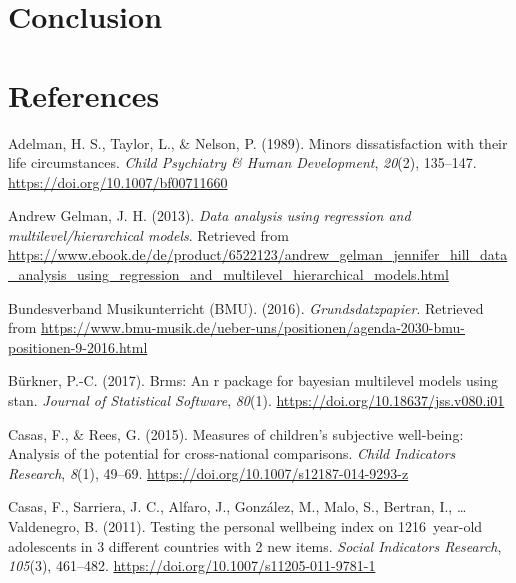 \documentclass[a4, 12pt]{article}
\begin{document}
\clearpage

\hypertarget{conclusion}{%
\section{Conclusion}\label{conclusion}}

\label{sec:conclusion}

\clearpage

\hypertarget{references}{%
\section*{References}\label{references}}

\singlespacing

\setlength{\parindent}{-0.5in}
\setlength{\leftskip}{0.5in}
\setlength{\parskip}{8pt}

\noindent

\hypertarget{refs}{}
\leavevmode\hypertarget{ref-Adelman1989}{}%
Adelman, H. S., Taylor, L., \& Nelson, P. (1989). Minors dissatisfaction with their life circumstances. \emph{Child Psychiatry \& Human Development}, \emph{20}(2), 135--147. \url{https://doi.org/10.1007/bf00711660}

\leavevmode\hypertarget{ref-AndrewGelman2013}{}%
Andrew Gelman, J. H. (2013). \emph{Data analysis using regression and multilevel/hierarchical models}. Retrieved from \url{https://www.ebook.de/de/product/6522123/andrew_gelman_jennifer_hill_data_analysis_using_regression_and_multilevel_hierarchical_models.html}

\leavevmode\hypertarget{ref-BundesverbandMusikunterricht}{}%
Bundesverband Musikunterricht (BMU). (2016). \emph{Grundsdatzpapier}. Retrieved from \url{https://www.bmu-musik.de/ueber-uns/positionen/agenda-2030-bmu-positionen-9-2016.html}

\leavevmode\hypertarget{ref-Buerkner2017}{}%
Bürkner, P.-C. (2017). Brms: An r package for bayesian multilevel models using stan. \emph{Journal of Statistical Software}, \emph{80}(1). \url{https://doi.org/10.18637/jss.v080.i01}

\leavevmode\hypertarget{ref-Casas2015}{}%
Casas, F., \& Rees, G. (2015). Measures of children's subjective well-being: Analysis of the potential for cross-national comparisons. \emph{Child Indicators Research}, \emph{8}(1), 49--69. \url{https://doi.org/10.1007/s12187-014-9293-z}

\leavevmode\hypertarget{ref-Casas2011}{}%
Casas, F., Sarriera, J. C., Alfaro, J., González, M., Malo, S., Bertran, I., \ldots{} Valdenegro, B. (2011). Testing the personal wellbeing index on 1216~year-old adolescents in 3 different countries with 2 new items. \emph{Social Indicators Research}, \emph{105}(3), 461--482. \url{https://doi.org/10.1007/s11205-011-9781-1}
\end{document}
